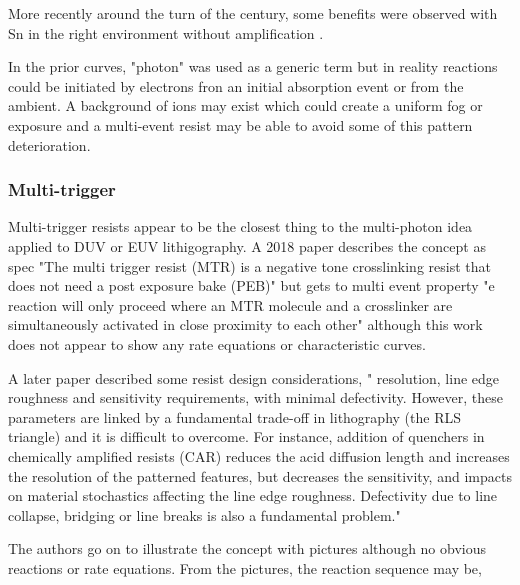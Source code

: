 More recently around the turn of the century, some benefits were
observed with Sn in the right environment without amplification
\cite{Belmonte_Cendron_Reddy_Mechanistic_insights_2020}.


In the prior curves, "photon" was used as a generic term
but in reality reactions could be initiated by electrons
fron an initial absorption event or from the ambient.
A background of ions may exist which could create a uniform
fog or exposure and a multi-event resist may be able to
avoid some of this pattern deterioration. 





\subsubsection{Multi-trigger }

Multi-trigger resists appear to be the closest thing to
the multi-photon idea applied to DUV or EUV lithigography.
A 2018 paper describes the concept as spec
"The multi trigger
resist (MTR) is a negative tone crosslinking resist that does not need a post exposure bake
(PEB)"
but gets to multi event property
"e reaction will only proceed where
an MTR molecule and a crosslinker are
simultaneously activated in close proximity to each
other"
\cite{Popescu_Vesters_McClelland_Multi_Trigger_Resist_2018}
although this work does not appear to show any rate equations or
characteristic curves.


A later paper 
\cite{RoelGronheidadditionalDanielPSanders_Multi_trigger_resist_novel_2019}
described some resist design considerations, "
resolution, line edge roughness and sensitivity requirements, 
with minimal defectivity. However, these parameters
are linked by a fundamental trade-off in lithography (the RLS triangle)
and it is difficult to overcome. For instance, addition of quenchers in
chemically amplified resists (CAR) reduces the acid diffusion length and
increases the resolution of the patterned features, but decreases the sensitivity,
and impacts on material stochastics affecting the line edge roughness. Defectivity
due to line collapse, bridging or line breaks is also a fundamental problem."
 
The authors go on to illustrate the concept with pictures although no
obvious reactions or rate equations.  From the pictures, the reaction
sequence may be, 

